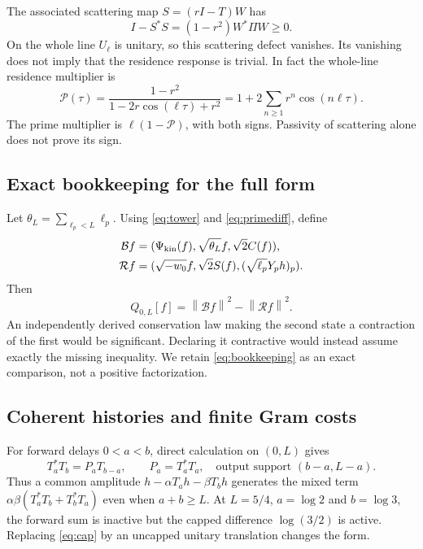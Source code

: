 \documentclass[11pt]{article}
\numberwithin{equation}{section}
\theoremstyle{definition}
\theoremstyle{remark}
\newcommand{\norm}[1]{\left\lVert#1\right\rVert}
\begin{document}
The associated scattering map $S=(rI-T)W$ has
\begin{equation}
 I-S^*S=(1-r^2)W^*\Pi W\ge0.
\end{equation}
On the whole line $U_\ell$ is unitary, so this scattering defect vanishes. Its vanishing does not imply that the residence response is trivial. In fact the whole-line residence multiplier is
\begin{equation}
 \mathcal P(\tau)=\frac{1-r^2}{1-2r\cos(\ell\tau)+r^2}
 =1+2\sum_{n\ge1}r^n\cos(n\ell\tau).
 \label{eq:Poissonwhole}
\end{equation}
The prime multiplier is $\ell(1-\mathcal P)$, with both signs. Passivity of scattering alone does not prove its sign.

\subsection{Exact bookkeeping for the full form}
Let $\theta_L=\sum_{\ell_p<L}\ell_p$. Using \eqref{eq:tower} and \eqref{eq:primediff}, define
\begin{align}
 \mathcal Bf&=(\Psi_{\rm kin}(f),\sqrt{\theta_L}f,\sqrt2C(f)),\\
 \mathcal Rf&=(\sqrt{-w_0}f,\sqrt2S(f),(\sqrt{\ell_p}Y_ph)_p).
\end{align}
Then
\begin{equation}
 Q_{0,L}[f]=\norm{\mathcal Bf}^2-\norm{\mathcal Rf}^2.
 \label{eq:bookkeeping}
\end{equation}
An independently derived conservation law making the second state a contraction of the first would be significant. Declaring it contractive would instead assume exactly the missing inequality. We retain \eqref{eq:bookkeeping} as an exact comparison, not a positive factorization.

\subsection{Coherent histories and finite Gram costs}
For forward delays $0<a<b$, direct calculation on $(0,L)$ gives
\begin{equation}
 T_a^*T_b=P_aT_{b-a},\qquad P_a=T_a^*T_a,
 \quad\text{output support }(b-a,L-a).
 \label{eq:cap}
\end{equation}
Thus a common amplitude $h-\alpha T_ah-\beta T_bh$ generates the mixed term
$\alpha\beta(T_a^*T_b+T_b^*T_a)$ even when $a+b\ge L$. At $L=5/4$, $a=\log2$ and $b=\log3$, the forward sum is inactive but the capped difference $\log(3/2)$ is active. Replacing \eqref{eq:cap} by an uncapped unitary translation changes the form.
\end{document}
